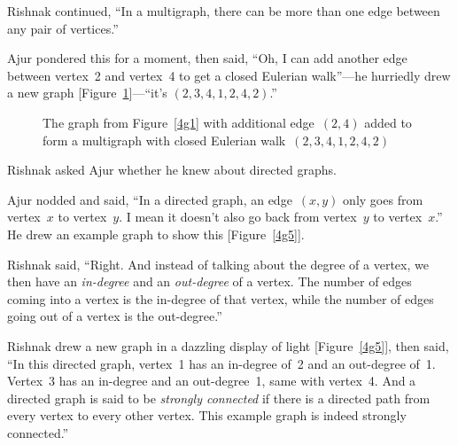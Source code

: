 Rishnak continued, ``In a multigraph, there can be more than one edge between any pair of vertices.''

Ajur pondered this for a moment, then said, ``Oh, I can add another edge between vertex~2 and vertex~4 to get a closed Eulerian walk''---he hurriedly drew a new graph [Figure~\ref{4g155}]---``it's $(2,3,4,1,2,4,2)$.''

\begin{figure}
\begin{center}
\caption{The graph from Figure~\ref{4g1} with additional edge~$(2,4)$ added to form a multigraph with closed Eulerian walk~$(2,3,4,1,2,4,2)$}\label{4g155}
\end{center}
\end{figure}

Rishnak asked Ajur whether he knew about directed graphs.

Ajur nodded and said, ``In a directed graph, an edge~$(x,y)$ only goes from vertex~$x$ to vertex~$y$. I mean it doesn't also go back from vertex~$y$ to vertex~$x$.'' He drew an example graph to show this [Figure~\ref{4g5}].

Rishnak said, ``Right. And instead of talking about the degree of a vertex, we then have an \textit{in-degree} and an \textit{out-degree} of a vertex. The number of edges coming into a vertex is the in-degree of that vertex, while the number of edges going out of a vertex is the out-degree.''

Rishnak drew a new graph in a dazzling display of light [Figure~\ref{4g5}], then said, ``In this directed graph, vertex~1 has an in-degree of~2 and an out-degree of~1. Vertex~3 has an in-degree  and an out-degree~1, same with vertex~4. And a directed graph is said to be \textit{strongly connected} if there is a directed path from every vertex to every other vertex. This example graph is indeed strongly connected.''

